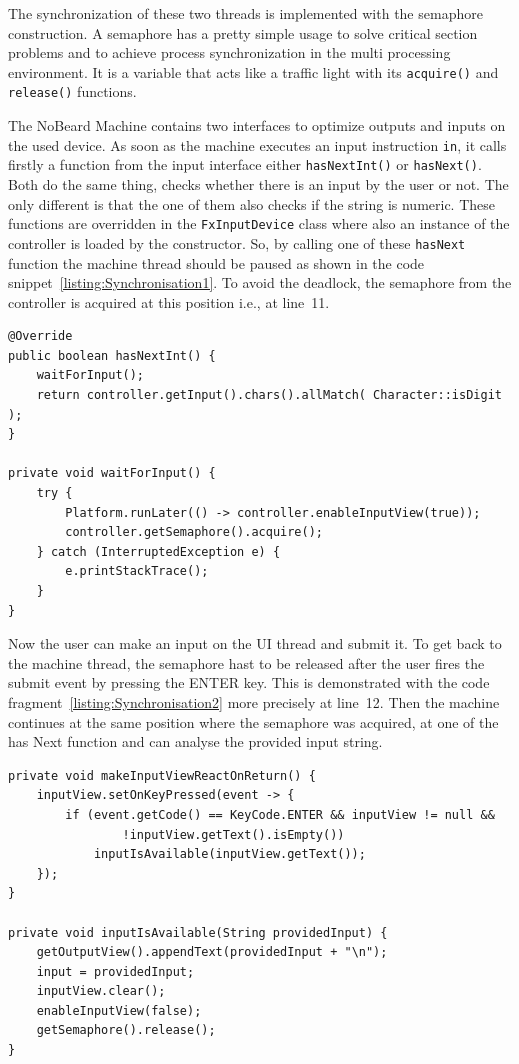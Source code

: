The synchronization of these two threads is implemented with the semaphore construction. A semaphore has a pretty simple usage to solve critical section problems and to achieve process synchronization in the multi processing environment. It is a variable that acts like a traffic light with its \lstinline$acquire()$ and \lstinline$release()$ functions.

The NoBeard Machine contains two interfaces to optimize outputs and inputs on the used device. As soon as the machine executes an input instruction \lstinline$in$, it calls firstly a function from the input interface either \lstinline$hasNextInt()$ or \lstinline$hasNext()$. Both do the same thing, checks whether there is an input by the user or not. The only different is that the one of them also checks if the string is numeric. These functions are overridden in the \lstinline$FxInputDevice$ class where also an instance of the controller is loaded by the constructor. So, by calling one of these \lstinline$hasNext$ function the machine thread should be paused as shown in the code snippet~\ref{listing:Synchronisation1}. To avoid the deadlock, the semaphore from the controller is acquired at this position i.e., at line~11.
\begin{lstlisting}[caption={Synchronisation with semaphore (Part 1)},label=listing:Synchronisation1]
@Override
public boolean hasNextInt() {
    waitForInput();
    return controller.getInput().chars().allMatch( Character::isDigit );
}

private void waitForInput() {
    try {
        Platform.runLater(() -> controller.enableInputView(true));
        controller.getSemaphore().acquire();
    } catch (InterruptedException e) {
        e.printStackTrace();
    }
}
\end{lstlisting}
Now the user can make an input on the UI thread and submit it. To get back to the machine thread, the semaphore hast to be released after the user fires the submit event by pressing the ENTER key. This is demonstrated with the code fragment~\ref{listing:Synchronisation2} more precisely at line~12. Then the machine continues at the same position where the semaphore was acquired, at one of the has Next function and can analyse the provided input string.
\begin{lstlisting}[caption={Synchronisation with semaphore (Part 2)},label=listing:Synchronisation2]
private void makeInputViewReactOnReturn() {
    inputView.setOnKeyPressed(event -> {
        if (event.getCode() == KeyCode.ENTER && inputView != null && 
        		!inputView.getText().isEmpty())
            inputIsAvailable(inputView.getText());
    });
}

private void inputIsAvailable(String providedInput) {
    getOutputView().appendText(providedInput + "\n");
    input = providedInput;
    inputView.clear();
    enableInputView(false);
    getSemaphore().release();
}
\end{lstlisting}
